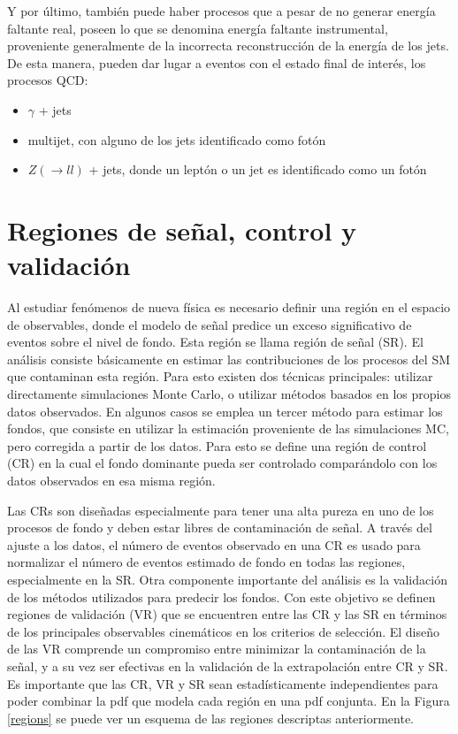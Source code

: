 Y por último, también puede haber procesos que a pesar de no generar energía faltante real, poseen lo que se denomina energía faltante instrumental, proveniente generalmente de la incorrecta reconstrucción de la energía de los jets. De esta manera, pueden dar lugar a eventos con el estado final de interés, los procesos QCD:

\begin{itemize}

	\item $\gamma$ + jets

	\item multijet, con alguno de los jets identificado como fotón

	\item $Z(\rightarrow ll)$ + jets, donde un leptón o un jet es identificado como un fotón

\end{itemize}



\section{Regiones de señal, control y validación}

Al estudiar fenómenos de nueva física es necesario definir una región en el espacio de observables, donde el modelo de señal predice un exceso significativo de eventos sobre el nivel de fondo. Esta región se llama región de señal (SR). El análisis consiste básicamente en estimar las contribuciones de los procesos del SM que contaminan esta región. Para esto existen dos técnicas principales: utilizar directamente simulaciones Monte Carlo, o utilizar métodos basados en los propios datos observados. En algunos casos se emplea un tercer método para estimar los fondos, que consiste en utilizar la estimación proveniente de las simulaciones MC, pero corregida a partir de los datos. Para esto se define una región de control (CR) en la cual el fondo dominante pueda ser controlado comparándolo con los
datos observados en esa misma región. 

Las CRs son diseñadas especialmente para tener una alta pureza en uno de los procesos de fondo y deben estar libres de contaminación de señal. A través del ajuste a los datos, el número de eventos observado en una CR es usado para normalizar el número de eventos estimado de fondo en todas las regiones, especialmente en la SR. Otra componente importante del análisis es la validación de los métodos utilizados para predecir los fondos. Con este objetivo se definen regiones de validación (VR) que se encuentren entre las CR y las SR en términos de los principales observables cinemáticos en los criterios de selección. El diseño de las VR comprende un compromiso entre minimizar la contaminación de la señal, y a su vez ser efectivas en la validación de la extrapolación entre CR y SR. Es importante que las CR, VR y SR sean estadísticamente independientes para poder combinar la pdf que modela cada región en una pdf conjunta. En la Figura \ref{regions} se puede ver un esquema de las regiones descriptas anteriormente.

